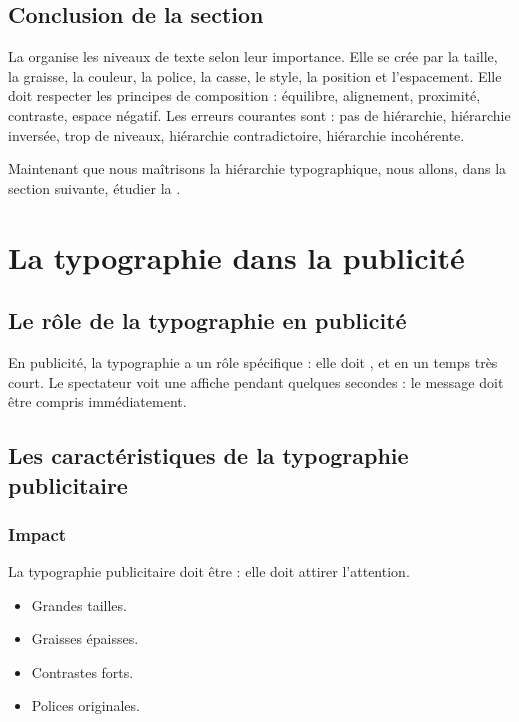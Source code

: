 \subsection*{Conclusion de la section}

\begin{retenir}
La  organise les niveaux de texte selon leur importance. Elle se crée par la taille, la graisse, la couleur, la police, la casse, le style, la position et l'espacement. Elle doit respecter les principes de composition : équilibre, alignement, proximité, contraste, espace négatif. Les erreurs courantes sont : pas de hiérarchie, hiérarchie inversée, trop de niveaux, hiérarchie contradictoire, hiérarchie incohérente.
\end{retenir}

Maintenant que nous maîtrisons la hiérarchie typographique, nous allons, dans la section suivante, étudier la .

\section{La typographie dans la publicité}

\subsection{Le rôle de la typographie en publicité}

En publicité, la typographie a un rôle spécifique : elle doit ,  et  en un temps très court. Le spectateur voit une affiche pendant quelques secondes : le message doit être compris immédiatement.

\subsection{Les caractéristiques de la typographie publicitaire}

\subsubsection{Impact}

La typographie publicitaire doit être  : elle doit attirer l'attention.

\begin{itemize}
    \item Grandes tailles.
    \item Graisses épaisses.
    \item Contrastes forts.
    \item Polices originales.
\end{itemize}

